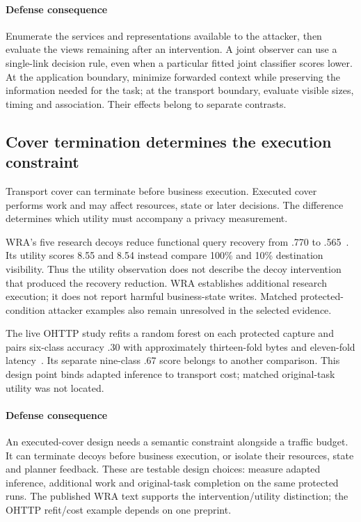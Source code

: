 \paragraph{Defense consequence}
Enumerate the services and representations available to the attacker, then evaluate the views remaining after an intervention. A joint observer can use a single-link decision rule, even when a particular fitted joint classifier scores lower. At the application boundary, minimize forwarded context while preserving the information needed for the task; at the transport boundary, evaluate visible sizes, timing and association. Their effects belong to separate contrasts.

\subsection{Cover termination determines the execution constraint}\label{sec:crosslink}
Transport cover can terminate before business execution. Executed cover performs work and may affect resources, state or later decisions. The difference determines which utility must accompany a privacy measurement.

WRA's five research decoys reduce functional query recovery from .770 to .565~\cite[Sec.~8.1]{jeong2026wra}. Its utility scores 8.55 and 8.54 instead compare 100\% and 10\% destination visibility. Thus the utility observation does not describe the decoy intervention that produced the recovery reduction. WRA establishes additional research execution; it does not report harmful business-state writes. Matched protected-condition attacker examples also remain unresolved in the selected evidence.

The live OHTTP study refits a random forest on each protected capture and pairs six-class accuracy .30 with approximately thirteen-fold bytes and eleven-fold latency~\cite[Sec.~9.7]{dangol2026workflow}. Its separate nine-class .67 score belongs to another comparison. This design point binds adapted inference to transport cost; matched original-task utility was not located.

\paragraph{Defense consequence}
An executed-cover design needs a semantic constraint alongside a traffic budget. It can terminate decoys before business execution, or isolate their resources, state and planner feedback. These are testable design choices: measure adapted inference, additional work and original-task completion on the same protected runs. The published WRA text supports the intervention/utility distinction; the OHTTP refit/cost example depends on one preprint.

